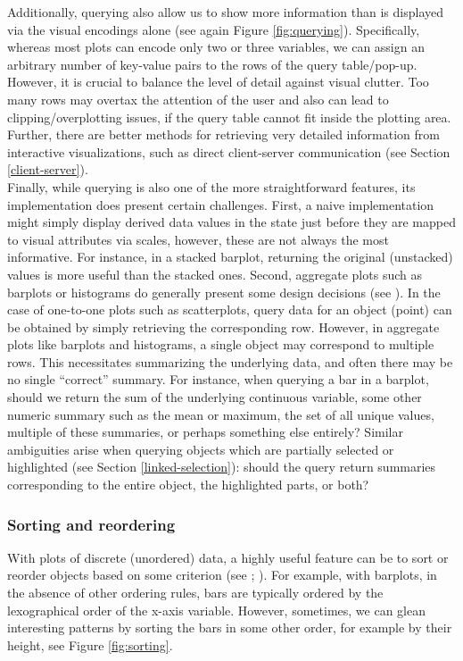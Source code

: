 \documentclass[
  openany]{book}
\theoremstyle{definition}
\theoremstyle{definition}
\theoremstyle{definition}
\theoremstyle{definition}
\theoremstyle{remark}
\begin{document}
Additionally, querying also allow us to show more information than is displayed via the visual encodings alone (see again Figure \ref{fig:querying}). Specifically, whereas most plots can encode only two or three variables, we can assign an arbitrary number of key-value pairs to the rows of the query table/pop-up. However, it is crucial to balance the level of detail against visual clutter. Too many rows may overtax the attention of the user and also can lead to clipping/overplotting issues, if the query table cannot fit inside the plotting area. Further, there are better methods for retrieving very detailed information from interactive visualizations, such as direct client-server communication (see Section \ref{client-server}).\\
Finally, while querying is also one of the more straightforward features, its implementation does present certain challenges. First, a naive implementation might simply display derived data values in the state just before they are mapped to visual attributes via scales, however, these are not always the most informative. For instance, in a stacked barplot, returning the original (unstacked) values is more useful than the stacked ones. Second, aggregate plots such as barplots or histograms do generally present some design decisions (see ). In the case of one-to-one plots such as scatterplots, query data for an object (point) can be obtained by simply retrieving the corresponding row. However, in aggregate plots like barplots and histograms, a single object may correspond to multiple rows. This necessitates summarizing the underlying data, and often there may be no single ``correct'' summary. For instance, when querying a bar in a barplot, should we return the sum of the underlying continuous variable, some other numeric summary such as the mean or maximum, the set of all unique values, multiple of these summaries, or perhaps something else entirely? Similar ambiguities arise when querying objects which are partially selected or highlighted (see Section \ref{linked-selection}): should the query return summaries corresponding to the entire object, the highlighted parts, or both?

\subsubsection{Sorting and reordering}\label{sorting-and-reordering}

With plots of discrete (unordered) data, a highly useful feature can be to sort or reorder objects based on some criterion (see ; ). For example, with barplots, in the absence of other ordering rules, bars are typically ordered by the lexographical order of the x-axis variable. However, sometimes, we can glean interesting patterns by sorting the bars in some other order, for example by their height, see Figure \ref{fig:sorting}.
\end{document}
